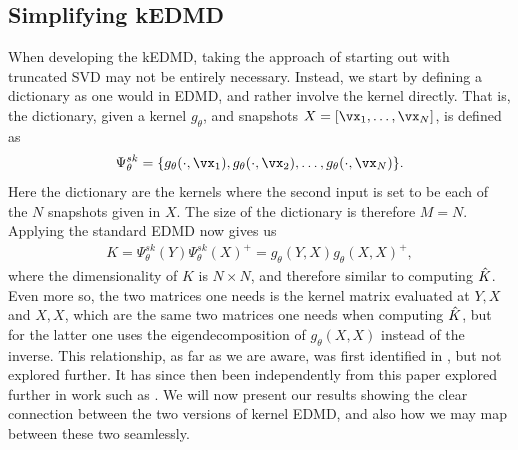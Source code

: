 \documentclass{article}
\begin{document}
\subsection{Simplifying kEDMD}\label{sec:skedmd}
When developing the kEDMD, taking the approach of starting out with truncated SVD may not be entirely necessary. Instead, we start by defining a dictionary as one would in EDMD, and rather involve the kernel directly. That is, the dictionary, given a kernel \(g_{\theta}\), and snapshots \(X = [\vx_1, \dots, \vx_N]\), is defined as 
\begin{align}\label{eq:skedmd_dict}
    \Psi^{sk}_{\theta} = \{g_{\theta}(\cdot, \vx_1), g_{\theta}(\cdot, \vx_2), \dots, g_{\theta}(\cdot, \vx_N)\}.
\end{align}
Here the dictionary are the kernels where the second input is set to be each of the \(N\) snapshots given in \(X\). The size of the dictionary is therefore \(M = N\). Applying the standard EDMD now gives us 
\begin{align}\label{eq:k_simplified}
    K = \Psi^{sk}_{\theta}(Y) \Psi^{sk}_{\theta}(X)^+ = g_{\theta}(Y,X) g_{\theta}(X,X)^+,
\end{align}
where the dimensionality of \(K\) is \(N\times N\), and therefore similar to computing \(\Hat K\). Even more so, the two matrices one needs is the kernel matrix evaluated at \(Y,X\) and \(X,X\), which are the same two matrices one needs when computing \(\Hat K\), but for the latter one uses the eigendecomposition of \(g_{\theta}(X,X)\) instead of the inverse. This relationship, as far as we are aware, was first identified in \citet{gonzalez-2021}, but not explored further. It has since then been independently from this paper explored further in work such as \citet{boulle-2025}. We will now present our results showing the clear connection between the two versions of kernel EDMD, and also how we may map between these two seamlessly.
\end{document}
